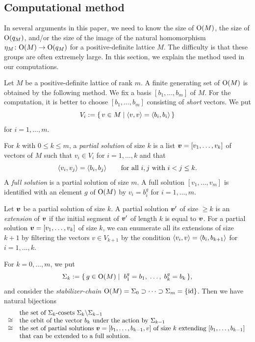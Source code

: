 \documentclass{amsart} %
\begin{document}
\subsection{Computational method}\label{subsec:computational}
%
In several arguments in this paper, 
we need to know the size of $\mathord{\mathrm{O}}(M)$,
the size of $\mathord{\mathrm{O}}(q_M)$, and/or 
the size of the image of the natural homomorphism
$\eta_M\colon \mathord{\mathrm{O}}(M) \to \mathord{\mathrm{O}}(q_M)$
for a positive-definite lattice $M$.
The difficulty is that these groups are often extremely large.
In this section, we explain the method used in our computations.
%
\par
%
Let $M$ be a positive-definite lattice of rank $m$.
A finite generating set of $\mathord{\mathrm{O}}(M)$ is obtained by the following method.
We fix a basis $[b_1, \dots, b_m]$ of $M$.
For the computation,
 it is better to choose $[b_1, \dots, b_m]$
 consisting of \emph{short} vectors.
 We put
\[
V_i:=\{\,{v\in M}\mid {\langle v, v \rangle=\langle b_i, b_i \rangle} \,\}
\]
for $i=1, \dots, m$.
%
\begin{definition}\label{def:solutions}
For $k$ with $0\le k\le m$,
a \emph{partial solution} of size $k$ is a list 
$\boldsymbol{v}=[v_1, \dots, v_k]$ of vectors of $M$ 
such that $v_i\in V_i$ for $i=1, \dots, k$ and that 
\[
\langle v_i, v_j \rangle=\langle b_i, b_j \rangle\;\;\quad\;\;\textrm{for all $i, j$ with $i<j\le k$.}
\]
A \emph{full solution} is a partial solution of size $m$.
A full solution $[v_1, \dots, v_m]$ is identified with an element $g$ 
of $\mathord{\mathrm{O}}(M)$ by $v_i=b_i^g$ for $ i=1, \dots, m$.
\par
Let $\boldsymbol{v}$ be a partial solution of size $k$.
A partial solution $\boldsymbol{v}^{\prime}$ of size $\ge k$ is
an \emph{extension} of $\boldsymbol{v}$ 
if the initial segment of $\boldsymbol{v}^{\prime}$ of length $k$ is equal to $\boldsymbol{v}$.
For a partial solution $\boldsymbol{v}=[v_1, \dots, v_k]$ of size $k$,
we can enumerate all its extensions of size $k+1$ by filtering the vectors $v\in V_{k+1}$
by the condition $\langle v_i, v \rangle=\langle b_i, b_{k+1} \rangle$ for $i=1, \dots, k$.
\end{definition}
%
%
%
For $k=0, \dots, m$, 
we put
\[
\Sigma_k:=\{\,{g\in \mathord{\mathrm{O}}(M)}\mid {\;b_1^g=b_1, \;\dots, \; b_k^g=b_k} \,\},
\]
and consider the \emph{stabilizer-chain} 
$\mathord{\mathrm{O}}(M)=\Sigma_0\supset \dots\supset \Sigma_m=\{\mathord{\mathrm{id}}\}$.
Then we have natural bijections
\[
\begin{array}{cl}
&\textrm{the set of $\Sigma_{k}$-cosets $\Sigma_{k}\backslash\Sigma_{k-1}$}\\
\cong &\textrm{the orbit of the vector $b_k$ under the action by $\Sigma_{k-1}$ }\\
\cong &\textrm{the set of partial solutions $\boldsymbol{v}=[b_1, \dots, b_{k-1}, v]$ of size $k$ 
 extending $[b_1, \dots, b_{k-1}]$ }\\
&\textrm{that can be extended to a full solution.}
\end{array}
\]
\end{document}
